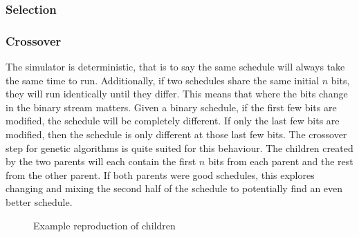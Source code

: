 \documentclass{article}
\def\listset{\pgfqkeys{/List}}
\begin{document}
\subsubsection{Selection}

\subsubsection{Crossover}
\noindent The simulator is deterministic, that is to say the same schedule will always take the same time to run. Additionally, if two schedules share the same initial $n$ bits, they will run identically until they differ. This means that where the bits change in the binary stream matters. Given a binary schedule, if the first few bits are modified, the schedule will be completely different. If only the last few bits are modified, then the schedule is only different at those last few bits. The crossover step for genetic algorithms is quite suited for this behaviour. The children created by the two parents will each contain the first $n$ bits from each parent and the rest from the other parent. If both parents were good schedules, this explores changing and mixing the second half of the schedule to potentially find an even better schedule. 
\begin{figure}[H]
\centering
{}
\caption{Example reproduction of children}
\label{fig:crossover}
\end{figure}
\end{document}

